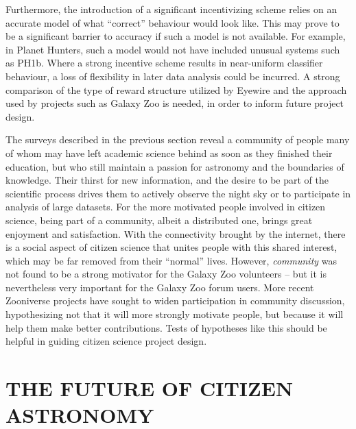 \documentclass{ar2e}
\begin{document}
Furthermore, the introduction of a significant incentivizing scheme relies on an
accurate model of what ``correct'' behaviour would look like. This may prove to
be a significant barrier to accuracy if such a model is not available. For
example, in Planet Hunters, such a model would not have included unusual systems
such as PH1b. Where a strong incentive scheme results in near-uniform classifier
behaviour, a loss of flexibility in later data analysis could be incurred.  A
strong comparison of the type of reward structure utilized by Eyewire and the
approach used by projects such as Galaxy Zoo is needed, in order to inform
future project design. 

The surveys described in the previous section reveal a community of people many
of whom may have left academic science behind as soon as they finished their 
education, but who still maintain a passion for astronomy and the boundaries of
knowledge.  Their thirst for new information, and the  desire to be part of the 
scientific process drives them to actively observe the  night sky or to
participate in analysis of large datasets.  For the more motivated people
involved in citizen science, being part of a community,  albeit a distributed
one, brings great enjoyment and satisfaction.  With the connectivity brought by
the internet, there is a social  aspect of citizen science that unites people
with this shared interest, which may be far removed from their ``normal'' 
lives. However, {\it community} was not found to be a strong motivator for the
Galaxy Zoo volunteers -- but it is nevertheless very important for the Galaxy
Zoo forum users. More recent Zooniverse projects have sought to widen
participation in community discussion, hypothesizing not that it will more
strongly motivate people, but because it will help them make better
contributions. Tests of hypotheses like this should be helpful in guiding
citizen science project design.



\section{THE FUTURE OF CITIZEN ASTRONOMY}
\label{sec:future}

\end{document}
